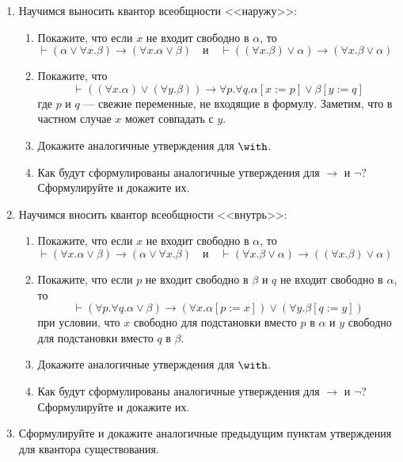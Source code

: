 \documentclass[10pt,a4paper,oneside]{article}
\begin{document}
\begin{enumerate}
\item Научимся выносить квантор всеобщности <<наружу>>:
\begin{enumerate}
\item Покажите, что если $x$ не входит свободно в $\alpha$, то
$$
\vdash(\alpha \vee \forall x.\beta) \rightarrow (\forall x.\alpha\vee\beta)\quad
\mbox{и}\quad
\vdash((\forall x.\beta)\vee\alpha) \rightarrow (\forall x.\beta\vee\alpha)\quad
$$
\item Покажите, что $$\vdash((\forall x.\alpha) \vee (\forall y.\beta)) \rightarrow \forall p.\forall q.\alpha[x:=p]\vee\beta[y := q]$$
где $p$ и $q$ --- свежие переменные, не входящие в формулу. Заметим, что в частном случае $x$ может совпадать с $y$.
\item Докажите аналогичные утверждения для $\with$.
\item Как будут сформулированы аналогичные утверждения для $\rightarrow$ и $\neg$? Сформулируйте и докажите их.
\end{enumerate}

\item Научимся вносить квантор всеобщности <<внутрь>>:
\begin{enumerate}
\item Покажите, что если $x$ не входит свободно в $\alpha$, то
$$
\vdash (\forall x.\alpha\vee\beta)\rightarrow(\alpha \vee \forall x.\beta)\quad
\mbox{и}\quad
\vdash (\forall x.\beta\vee\alpha)\rightarrow((\forall x.\beta)\vee\alpha)\quad
$$

\item Покажите, что если $p$ не входит свободно в $\beta$ и $q$ не входит свободно в $\alpha$, то
$$\vdash(\forall p.\forall q.\alpha\vee\beta) \rightarrow (\forall x.\alpha[p := x]) \vee (\forall y.\beta[q := y])$$
при условии, что $x$ свободно для подстановки вместо $p$ в $\alpha$ и $y$ свободно для подстановки вместо $q$ в $\beta$.
\item Докажите аналогичные утверждения для $\with$.
\item Как будут сформулированы аналогичные утверждения для $\rightarrow$ и $\neg$? Сформулируйте и докажите их.
\end{enumerate}

\item Сформулируйте и докажите аналогичные предыдущим пунктам утверждения для квантора существования.


\end{enumerate}
\end{document}
